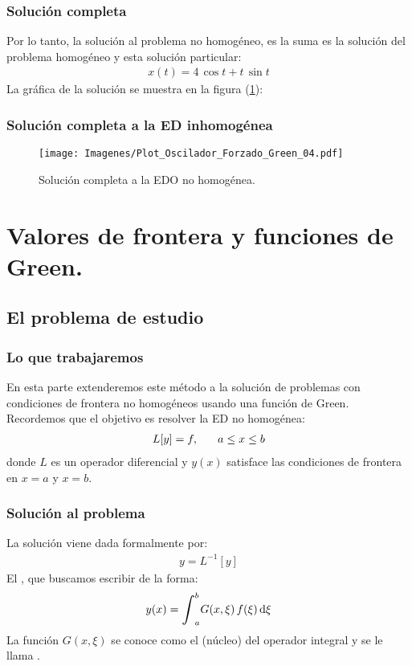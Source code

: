 \documentclass[12pt]{beamer}
\begin{document}
\begin{frame}
\frametitle{Solución completa}
Por lo tanto, la solución al problema no homogéneo, es la suma es la solución del problema homogéneo y esta solución particular:
\pause
\begin{align*}
x (t) = 4 \, \cos t + t \, \sin t
\end{align*}
La gráfica de la solución se muestra en la figura (\ref{fig:figura_04}):
\end{frame}

\begin{frame}
\frametitle{Solución completa a la ED inhomogénea}
\begin{figure}[H]
    \centering
    \texttt{[image: Imagenes/Plot\_Oscilador\_Forzado\_Green\_04.pdf]}
    \caption{Solución completa a la EDO no homogénea.}
    \label{fig:figura_04}
\end{figure}
\end{frame}


\section{Valores de frontera y funciones de Green.}
\subsection{El problema de estudio}

\begin{frame}
\frametitle{Lo que trabajaremos}
En esta parte extenderemos este método a la solución de problemas con condiciones de frontera no homogéneos usando una función de Green.
\\
\bigskip
\pause
Recordemos que el objetivo es resolver la ED no homogénea:
\pause
\begin{align*}
L [y] = f, \hspace{0.6cm} a \leq x \leq b
\end{align*}
donde $L$ es un operador diferencial y $y (x)$ satisface las condiciones de frontera en $x = a$ y $x = b$.
\end{frame}

\begin{frame}
\frametitle{Solución al problema}
La solución viene dada formalmente por:
\pause
\begin{align*}
y = L^{-1} [y]
\end{align*}
\pause
El , que buscamos escribir de la forma:
\pause
\begin{align*}
y (x) = \scaleint{6ex}_{a}^{b} G (x, \xi) \, f (\xi) \dd{\xi} 
\end{align*}
La función $G (x, \xi)$ se conoce como el  (núcleo) del operador integral y se le llama .
\end{frame}
\end{document}

